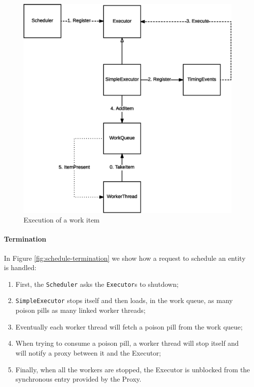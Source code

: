 \begin{figure}[H]
\centering
\includegraphics[scale=0.5,keepaspectratio]{images/solution/app/backend/scheduling-execution.eps}
\caption{Execution of a work item}
\label{fig:schedule-execution}
\end{figure}

\paragraph{Termination}

In Figure \ref{fig:schedule-termination} we show how a request to schedule an
entity is handled:

\begin{enumerate}
  \item First, the \texttt{Scheduler} asks the \texttt{Executor}s to shutdown;
  \item \texttt{SimpleExecutor} stops itself and then loads, in the work queue,
    as many poison pills as many linked worker threads;
  \item Eventually each worker thread will fetch a poison pill from the work
    queue;
  \item When trying to consume a poison pill, a worker thread will stop
    itself and will notify a proxy between it and the Executor;
  \item Finally, when all the workers are stopped, the Executor is unblocked
    from the synchronous entry provided by the Proxy.
\end{enumerate}

